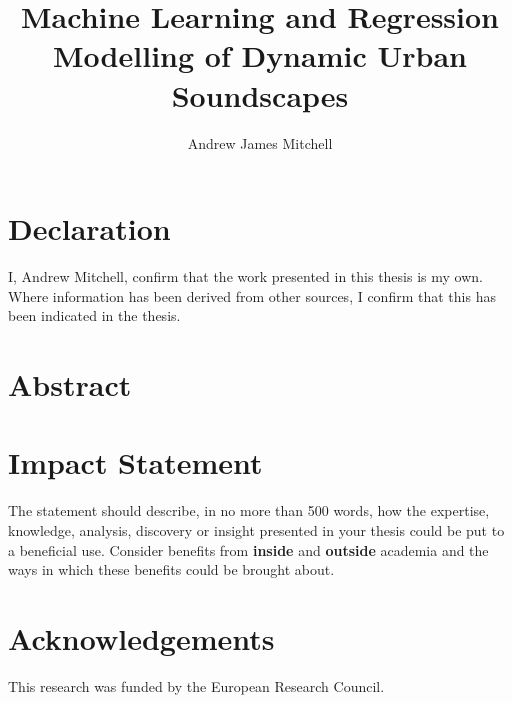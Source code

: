 \documentclass[twoside,fontsize=12pt,titlepage]{scrbook}
\title{Machine Learning and Regression Modelling of Dynamic Urban Soundscapes}
\author{Andrew James Mitchell}
\begin{document}
\begin{titlepage}
    \AddToShipoutPicture*{}
    \maketitle
\end{titlepage}


\restoregeometry


\chapter*{Declaration}
I, Andrew Mitchell, confirm that the work presented in this thesis is my own. Where information has been derived from other sources, I confirm that this has been indicated in the thesis.

\chapter*{Abstract}


\chapter*{Impact Statement}
The statement should describe, in no more than 500 words, how the expertise, knowledge, analysis, discovery or insight presented in your thesis could be put to a beneficial use. Consider benefits from \textbf{inside} and \textbf{outside} academia and the ways in which these benefits could be brought about.

\chapter*{Acknowledgements}
This research was funded by the European Research Council.
\end{document}
